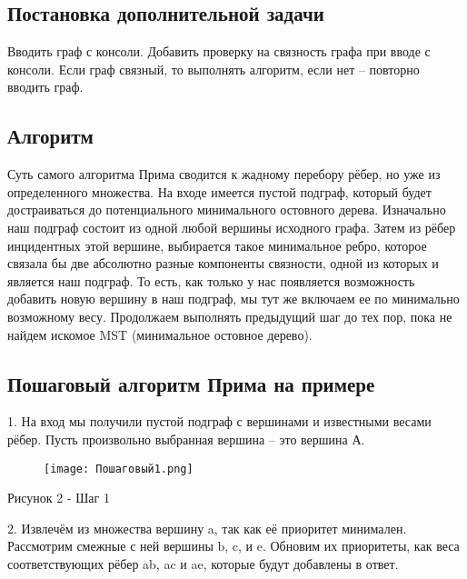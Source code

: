 \documentclass[a4paper,16pt]{article}
\begin{document}
    \subsection{Постановка дополнительной задачи}

Вводить граф с консоли. Добавить проверку на связность графа при вводе с консоли. Если граф связный, то выполнять алгоритм, если нет – повторно вводить граф.  

\newpage 

\begin{center}
   \section{Алгоритм} 
\end{center}

Суть самого алгоритма Прима сводится к жадному перебору рёбер, но уже из определенного множества. На входе имеется пустой подграф, который будет достраиваться до потенциального минимального остовного дерева.
Изначально наш подграф состоит из одной любой вершины исходного графа. Затем из рёбер инцидентных этой вершине, выбирается такое минимальное ребро, которое связала бы две абсолютно разные компоненты связности, одной из которых и является наш подграф. То есть, как только у нас появляется возможность добавить новую вершину в наш подграф, мы тут же включаем ее по минимально возможному весу. Продолжаем выполнять предыдущий шаг до тех пор, пока не найдем искомое MST (минимальное остовное дерево). 

 \subsection{Пошаговый алгоритм Прима на примере}
 
1. На  вход мы получили пустой подграф с вершинами и известными весами рёбер. Пусть произвольно выбранная вершина – это вершина А.

\begin{figure}[h]
    \centering
    \texttt{[image: Пошаговый1.png]}
\end{figure}
\hypertarget{1}{}

\begin{center}
    Рисунок 2 - Шаг 1
\end{center}

2. Извлечём из множества вершину a, так как её приоритет минимален.
Рассмотрим смежные с ней вершины b, c, и e.  Обновим их приоритеты, как веса соответствующих рёбер ab, ac и ae, которые будут добавлены в ответ.
\end{document}
